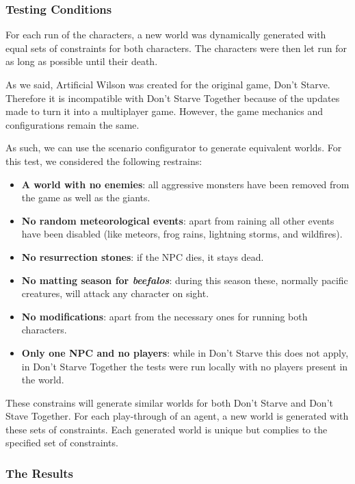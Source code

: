 \subsubsection{Testing Conditions}

For each run of the characters, a new world was dynamically generated with equal sets of constraints for both characters.
The characters were then let run for as long as possible until their death.

As we said, Artificial Wilson was created for the original game, Don't Starve.
Therefore it is incompatible with Don't Starve Together because of the updates made to turn it into a multiplayer game.
However, the game mechanics and configurations remain the same.

As such, we can use the scenario configurator to generate equivalent worlds.
For this test, we considered the following restrains:

\begin{itemize}
	 \item \textbf{A world with no enemies}: all aggressive monsters have been removed from the game as well as the giants.
     \item \textbf{No random meteorological events}: apart from raining all other events have been disabled (like meteors,  frog rains, lightning storms, and wildfires).
     \item \textbf{No resurrection stones}: if the NPC dies, it stays dead.
     \item \textbf{No matting season for \textit{beefalos}}: during this season these, normally pacific creatures, will attack any character on sight.
     \item \textbf{No modifications}: apart from the necessary ones for running both characters.
     \item \textbf{Only one NPC and no players}: while in Don't Starve this does not apply, in Don't Starve Together the tests were run locally with no players present in the world.
\end{itemize}

These constrains will generate similar worlds for both Don't Starve and Don't Stave Together.
For each play-through of an agent, a new world is generated with these sets of constraints.
Each generated world is unique but complies to the specified set of constraints.

\subsubsection{The Results}

